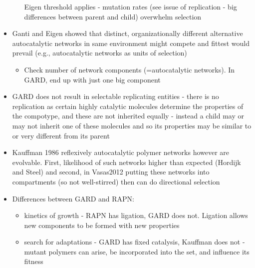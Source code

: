 \begin{itemize}
\begin{itemize}
				Eigen threshold applies - mutation rates (see issue of replication -
				big differences between parent and child) overwhelm selection
				
			\end{itemize}
			\item
			
			Ganti and Eigen showed that distinct, organizationally different
			alternative autocatalytic networks in same environment might compete
			and fittest would prevail (e.g., autocatalytic networks as units of
			selection)
			
			
			\begin{itemize}
				\item
				
				Check number of network components (=autocatalytic networks). In
				GARD, end up with just one big component
				
			\end{itemize}
			\item
			
			GARD does not result in selectable replicating entities - there is no
			replication as certain highly catalytic molecules determine the
			properties of the compotype, and these are not inherited equally -
			instead a child may or may not inherit one of these molecules and so
			its properties may be similar to or very different from its parent
			
			\item
			
			Kauffman 1986 reflexively autocatalytic polymer networks however are
			evolvable. First, likelihood of such networks higher than expected
			(Hordijk and Steel) and second, in Vasas2012 putting these networks
			into compartments (so not well-stirred) then can do directional
			selection
			
			\item
			
			Differences between GARD and RAPN:
			
			
			\begin{itemize}
				\item
				
				kinetics of growth - RAPN has ligation, GARD does not. Ligation
				allows new components to be formed with new properties
				
				\item
				
				search for adaptations - GARD has fixed catalysis, Kauffman does not
				- mutant polymers can arise, be incorporated into the set, and
				influence its fitness
				

\end{itemize}
\end{itemize}
